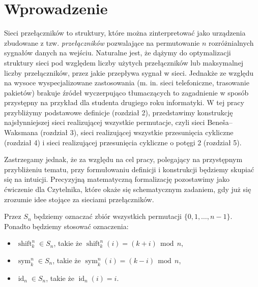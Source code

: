 \documentclass[a4paper]{article}
\renewcommand{\mod}{\, \operatorname{mod} \,}
\newcommand{\shift}[2]{\operatorname{shift}_{#2}^{#1}}
\newcommand{\sym}[2]{\operatorname{sym}_{#2}^{#1}}
\newcommand{\id}[1]{\operatorname{id}_{#1}}
\theoremstyle{definition}
\begin{document}
\section{Wprowadzenie}

Sieci przełączników to struktury, które można zinterpretować jako urządzenia zbudowane z tzw. \textit{przełączników} pozwalające na permutowanie \(n\) rozróżnialnych sygnałów danych na wejściu. Naturalne jest, że dążymy do optymalizacji struktury sieci pod względem liczby użytych przełączników lub maksymalnej liczby przełączników, przez jakie przepływa sygnał w sieci. Jednakże ze względu na wysoce wyspecjalizowane zastosowania (m. in. sieci telefoniczne, trasowanie pakietów) brakuje źródeł wyczerpująco tłumaczących to zagadnienie w sposób przystępny na przykład dla studenta drugiego roku informatyki. W tej pracy przybliżymy podstawowe definicje (rozdział 2), przedstawimy konstrukcję najsłynniejszej sieci realizującej wszystkie permutacje, czyli sieci Beneša--Waksmana (rozdział 3), sieci realizującej wszystkie przesunięcia cykliczne (rozdział 4) i sieci realizującej przesunięcia cykliczne o potęgi 2 (rozdział 5).  

\vspace{1em}

Zastrzegamy jednak, że za względu na cel pracy, polegający na przystępnym przybliżeniu tematu, przy formułowaniu definicji i konstrukcji będziemy skupiać się na intuicji. Precyzyjną matematyczną formalizację pozostawimy jako ćwiczenie dla Czytelnika, które okaże się schematycznym zadaniem, gdy już się zrozumie idee stojące za sieciami przełączników. 

\vspace{1em}

Przez \(S_n\) będziemy oznaczać zbiór wszystkich permutacji \(\{0, 1, \ldots, n-1\}\). Ponadto będziemy stosować oznaczenia:

\begin{itemize}
    \item \(\shift{n}{k} \in S_n\), takie że \(\shift{n}{k}(i) = (k+i) \mod n\),
    \item \(\sym{n}{k} \in S_n\), takie że \( \sym{n}{k}(i) = (k-i) \mod n \), 
    \item \(\id{n} \in S_n\), takie że \(\id n (i) = i \).
\end{itemize}

\vspace{1em}
\end{document}
